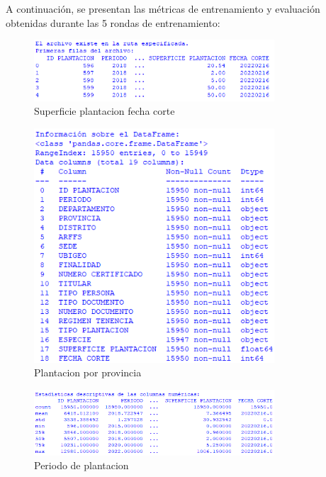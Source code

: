A continuación, se presentan las métricas de entrenamiento y evaluación obtenidas durante las 5 rondas de entrenamiento:
\begin{figure}[H]
	\centering
	\includegraphics[width=0.8\textwidth]{IMAGEN 2.1.png} %
	\caption{Superficie plantacion fecha corte}
	\label{fig:superficie_especie}
\end{figure}

\begin{figure}[H]
	\centering
	\includegraphics[width=0.8\textwidth]{IMAGEN 2.2.png} %
	\caption{Plantacion por provincia}
	\label{fig:superficie_especie}
\end{figure}

\begin{figure}[H]
	\centering
	\includegraphics[width=0.8\textwidth]{IMAGEN 2.3.png} %
	\caption{Periodo de plantacion}
	\label{fig:superficie_especie}
\end{figure}

